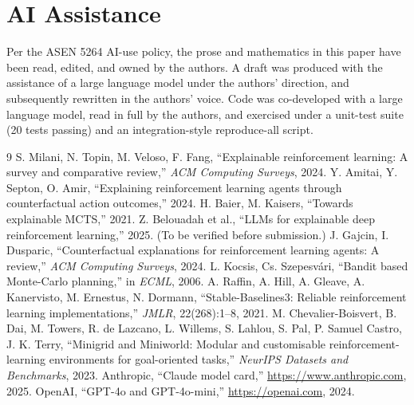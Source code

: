\documentclass[conference]{IEEEtran}
\begin{document}
\section*{AI Assistance}
Per the ASEN 5264 AI-use policy, the prose and mathematics in this
paper have been read, edited, and owned by the authors. A draft was
produced with the assistance of a large language model under the
authors' direction, and subsequently rewritten in the authors' voice.
Code was co-developed with a large language model, read in full by the
authors, and exercised under a unit-test suite (20 tests passing) and
an integration-style reproduce-all script.

\begin{thebibliography}{9}
 S. Milani, N. Topin, M. Veloso, F. Fang,
  ``Explainable reinforcement learning: A survey and comparative
  review,'' \emph{ACM Computing Surveys}, 2024.
 Y. Amitai, Y. Septon, O. Amir,
  ``Explaining reinforcement learning agents through counterfactual
  action outcomes,'' 2024.
 H. Baier, M. Kaisers, ``Towards
  explainable MCTS,'' 2021.
 Z. Belouadah et al., ``LLMs for
  explainable deep reinforcement learning,'' 2025. (To be verified
  before submission.)
 J. Gajcin, I. Dusparic, ``Counterfactual
  explanations for reinforcement learning agents: A review,''
  \emph{ACM Computing Surveys}, 2024.
 L. Kocsis, Cs. Szepesv\'ari, ``Bandit based
  Monte-Carlo planning,'' in \emph{ECML}, 2006.
 A. Raffin, A. Hill, A. Gleave, A. Kanervisto,
  M. Ernestus, N. Dormann, ``Stable-Baselines3: Reliable reinforcement
  learning implementations,'' \emph{JMLR}, 22(268):1--8, 2021.
 M. Chevalier-Boisvert, B. Dai, M. Towers,
  R. de Lazcano, L. Willems, S. Lahlou, S. Pal, P. Samuel Castro,
  J. K. Terry, ``Minigrid and Miniworld: Modular and customisable
  reinforcement-learning environments for goal-oriented tasks,''
  \emph{NeurIPS Datasets and Benchmarks}, 2023.
 Anthropic, ``Claude model card,''
  \url{https://www.anthropic.com}, 2025.
 OpenAI, ``GPT-4o and GPT-4o-mini,''
  \url{https://openai.com}, 2024.
\end{thebibliography}
\end{document}
